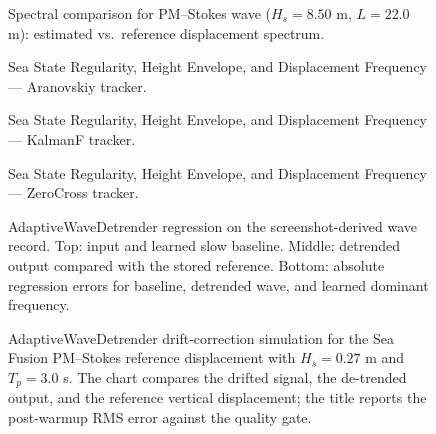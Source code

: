 \documentclass[11pt,letterpaper]{article}
\begin{document}
\begin{figure}[H]\centering
  \resizebox{\textwidth}{!}{}
  \caption{Spectral comparison for PM–Stokes wave ($H_s = 8.50$ m, $L = 22.0$ m):
  estimated vs.\ reference displacement spectrum.}
  \label{fig:regspec_pmstokes_high}
\end{figure}


\begin{figure}[H]\centering
  \resizebox{\textwidth}{!}{}
  \caption{Sea State Regularity, Height Envelope, and Displacement Frequency — Aranovskiy tracker.}
  \label{fig:seareg_aranovskiy}
\end{figure}

\begin{figure}[H]\centering
  \resizebox{\textwidth}{!}{}
  \caption{Sea State Regularity, Height Envelope, and Displacement Frequency — KalmanF tracker.}
  \label{fig:seareg_kalmanf}
\end{figure}

\begin{figure}[H]\centering
  \resizebox{\textwidth}{!}{}
  \caption{Sea State Regularity, Height Envelope, and Displacement Frequency — ZeroCross tracker.}
  \label{fig:seareg_zerocross}
\end{figure}



\begin{figure}[H]\centering
  \resizebox{\textwidth}{!}{}
  \caption{AdaptiveWaveDetrender regression on the screenshot-derived wave record. Top: input and learned slow baseline. Middle: detrended output compared with the stored reference. Bottom: absolute regression errors for baseline, detrended wave, and learned dominant frequency.}
  \label{fig:adaptive_wave_detrender_regression}
\end{figure}


\begin{figure}[H]\centering
  \resizebox{\textwidth}{!}{}
  \caption{AdaptiveWaveDetrender drift-correction simulation for the Sea Fusion PM--Stokes reference displacement with $H_s = 0.27$ m and $T_p = 3.0$ s. The chart compares the drifted signal, the de-trended output, and the reference vertical displacement; the title reports the post-warmup RMS error against the quality gate.}
  \label{fig:adaptive_wave_detrender_sim_low}
\end{figure}
\end{document}
